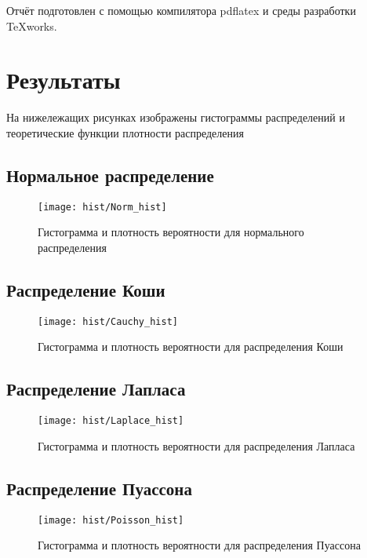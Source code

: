Отчёт подготовлен с помощью компилятора pdflatex и среды разработки TeXworks.

\section{Результаты}
На нижележащих рисунках изображены гистограммы распределений и теоретические функции плотности распределения

\subsection{Нормальное распределение}
\begin{figure}[H]
	\begin{center}
		\texttt{[image: hist/Norm\_hist]}
		\caption{Гистограмма и плотность вероятности для нормального распределения} 
		\label{pic:pic_name}
	\end{center}
\end{figure}

\subsection{Распределение Коши}
\begin{figure}[H]
	\begin{center}
		\texttt{[image: hist/Cauchy\_hist]}
		\caption{Гистограмма и плотность вероятности для распределения Коши} 
		\label{pic:pic_name} 
	\end{center}
\end{figure}

\subsection{Распределение Лапласа}
\begin{figure}[H]
	\begin{center}
		\texttt{[image: hist/Laplace\_hist]}
		\caption{Гистограмма и плотность вероятности для распределения Лапласа} 
		\label{pic:pic_name} 
	\end{center}
\end{figure}

\subsection{Распределение Пуассона}
\begin{figure}[H]
	\begin{center}
		\texttt{[image: hist/Poisson\_hist]}
		\caption{Гистограмма и плотность вероятности для распределения Пуассона} 
		\label{pic:pic_name} 
	\end{center}
\end{figure}

